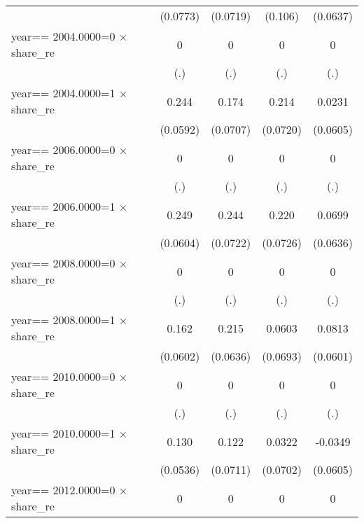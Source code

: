 \begin{table}[htbp]
\begin{tabular}{l*{4}{c}}
                & (0.0773)         & (0.0719)         &  (0.106)         & (0.0637)         \\
\addlinespace
year==  2004.0000=0 $\times$ share\_re&        0         &        0         &        0         &        0         \\
                &      (.)         &      (.)         &      (.)         &      (.)         \\
\addlinespace
year==  2004.0000=1 $\times$ share\_re&    0.244\sym{***}&    0.174\sym{**} &    0.214\sym{***}&   0.0231         \\
                & (0.0592)         & (0.0707)         & (0.0720)         & (0.0605)         \\
\addlinespace
year==  2006.0000=0 $\times$ share\_re&        0         &        0         &        0         &        0         \\
                &      (.)         &      (.)         &      (.)         &      (.)         \\
\addlinespace
year==  2006.0000=1 $\times$ share\_re&    0.249\sym{***}&    0.244\sym{***}&    0.220\sym{***}&   0.0699         \\
                & (0.0604)         & (0.0722)         & (0.0726)         & (0.0636)         \\
\addlinespace
year==  2008.0000=0 $\times$ share\_re&        0         &        0         &        0         &        0         \\
                &      (.)         &      (.)         &      (.)         &      (.)         \\
\addlinespace
year==  2008.0000=1 $\times$ share\_re&    0.162\sym{***}&    0.215\sym{***}&   0.0603         &   0.0813         \\
                & (0.0602)         & (0.0636)         & (0.0693)         & (0.0601)         \\
\addlinespace
year==  2010.0000=0 $\times$ share\_re&        0         &        0         &        0         &        0         \\
                &      (.)         &      (.)         &      (.)         &      (.)         \\
\addlinespace
year==  2010.0000=1 $\times$ share\_re&    0.130\sym{**} &    0.122\sym{*}  &   0.0322         &  -0.0349         \\
                & (0.0536)         & (0.0711)         & (0.0702)         & (0.0605)         \\
\addlinespace
year==  2012.0000=0 $\times$ share\_re&        0         &        0         &        0         &        0         \\

\end{tabular}
\end{table}
